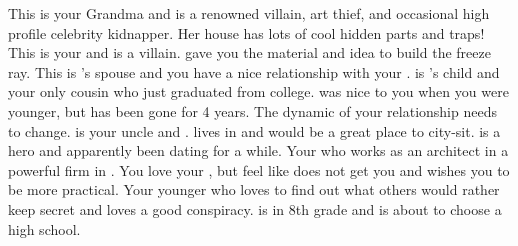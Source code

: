 \documentclass[char]{LRSguildcamp1}
\begin{document}
\begin{itemz}[Notes]
	\item 
\end{itemz}
\begin{contacts}
	\contact{\cGrandma{}} This is your Grandma and is a renowned villain, art thief, and occasional high profile celebrity kidnapper. Her house has lots of cool hidden parts and traps!
	\contact{\cOldest{}} This is your  \cOldest{\uncle} and is a villain.  gave you the material and idea to build the freeze ray.
	\contact{\cOS{}} This is \cOldest{}'s spouse and you have a nice relationship with your \cOS{\uncle}.
	\contact{\cGrad{}} \cGrad{} is \cOldest{}'s child and your only cousin who just graduated from college. \cGrad{} was nice to you when you were younger, but has been gone for 4 years. The dynamic of your relationship needs to change. 
	\contact{\cYoungest{}} \cYoungest{} is your uncle and \cYoungest{\hero}. \cYoungest{} lives in \pCityYoungest{} and would be a great place to city-sit.  
	\contact{\cYS{}} \cYS{} is a hero and apparently been dating \cYoungest{} for a while. 
	\contact{\cArchitect{}} Your \cArchitect{\parent} who works as an architect in a powerful firm in \pCityArchitect{}.  You love your \cArchitect{\parent}, but feel like \cArchitect{\they} does not get you and wishes you to be more practical. 
	 	\contact{\cTween{}} Your younger \cTween{\sibling} who loves to find out what others would rather keep secret and loves a good conspiracy. \cTween{} is in 8th grade and is about to choose a high school.
\end{contacts}
\end{document}
